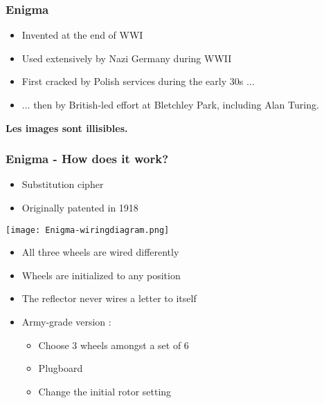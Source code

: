 \documentclass[
hyperref={pdfpagelabels=false}
,xcolor=table
]
{beamer}
\begin{document}
\begin{frame}
  \frametitle{Enigma}


  \vspace{-2cm}
  
  \begin{itemize}
  \item Invented at the end of WWI
  \item Used extensively by Nazi Germany during WWII
  \item First cracked by Polish services during the early 30s ... 
  \item ... then by British-led effort at Bletchley Park, including Alan Turing. 
  \end{itemize}

  \textbf{Les images sont illisibles. }
  
\end{frame}


\begin{frame}
  \frametitle{Enigma - How does it work?}

  \begin{itemize}
  \item Substitution cipher
  \item Originally patented in 1918
  \end{itemize}

  \begin{center}
    \texttt{[image: Enigma-wiringdiagram.png]}
  \end{center}

  

  
  \begin{itemize}
  \item All three wheels are wired differently 
  \item Wheels are initialized to any position
  \item The reflector never wires a letter to itself
  \item Army-grade version :
    \begin{itemize}
    \item Choose 3 wheels amongst a set of 6
    \item Plugboard
    \item Change the initial rotor setting
    \end{itemize}
  \end{itemize}
  
\end{frame}
\end{document}
